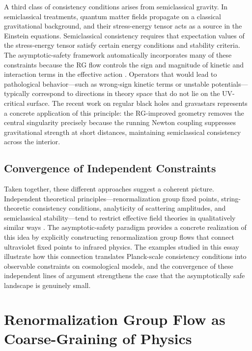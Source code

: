 \documentclass[12pt,a4paper]{article}
\begin{document}
A third class of consistency conditions arises from semiclassical gravity.
In semiclassical treatments, quantum matter fields propagate on a classical
gravitational background, and their stress-energy tensor acts as a source in
the Einstein equations. Semiclassical consistency requires that expectation
values of the stress-energy tensor satisfy certain energy conditions and
stability criteria. The asymptotic-safety framework automatically incorporates
many of these constraints because the RG flow controls the sign and magnitude
of kinetic and interaction terms in the effective action \cite{Percacci2017,
ReuterSaueressig2012}. Operators that would lead to pathological behavior---such
as wrong-sign kinetic terms or unstable potentials---typically correspond to
directions in theory space that do not lie on the UV-critical surface. The
recent work on regular black holes and gravastars \cite{EichhornFernandes2025,
CarballoRubioEtal2025} represents a concrete application of this principle:
the RG-improved geometry removes the central singularity precisely because the
running Newton coupling suppresses gravitational strength at short distances,
maintaining semiclassical consistency across the interior.

\subsection{Convergence of Independent Constraints}

Taken together, these different approaches suggest a coherent picture.
Independent theoretical principles---renormalization group fixed points,
string-theoretic consistency conditions, analyticity of scattering amplitudes,
and semiclassical stability---tend to restrict effective field theories in
qualitatively similar ways \cite{BuoninfanteEtal2025,EichhornSchiffer2022handbook}.
The asymptotic-safety paradigm provides a concrete realization of this idea by
explicitly constructing renormalization group flows that connect ultraviolet
fixed points to infrared physics. The examples studied in this essay illustrate
how this connection translates Planck-scale consistency conditions into
observable constraints on cosmological models, and the convergence of these
independent lines of argument strengthens the case that the asymptotically safe
landscape is genuinely small.

\section{Renormalization Group Flow as Coarse-Graining of Physics}
\end{document}
